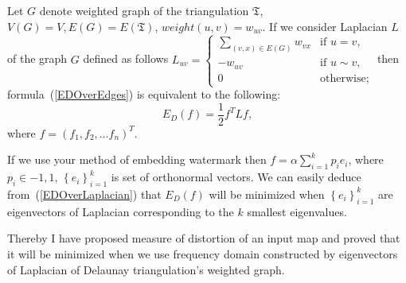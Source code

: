 \documentclass{article}
\begin{document}
Let $G$ denote weighted graph of the triangulation $\mathfrak{T}$, $V(G) = V, E(G) = E(\mathfrak{T})$, $weight(u, v) = w_{uv}$. If we consider Laplacian $L$ of the graph $G$ defined as follows 
$L_{uv} = \begin{cases}
  \sum_{(v, x) \in E(G)}{w_{vx}}&\text{if $u = v,$} \\
  -w_{uv}&\text{if $u \sim v,$} \\
  0 &\text{otherwise;}
\end{cases}
$ then formula~(\ref{EDOverEdges}) is equivalent to the following:
\begin{equation}
\label{EDOverLaplacian}
  E_D(f) = \frac{1}{2} f^T L f,
\end{equation}
where $f = (f_1, f_2, \dots f_n)^T$.

If we use your method of embedding watermark then $f = \alpha \sum_{i=1}^k p_i e_i$, where $p_i \in {-1, 1}$, $\left\{e_i\right\}_{i=1}^k$ is set of orthonormal vectors.
We can easily deduce from~(\ref{EDOverLaplacian}) that $E_D(f)$ will be minimized when $\left\{e_i\right\}_{i=1}^k$ are eigenvectors of Laplacian corresponding to the $k$ smallest eigenvalues.

Thereby I have proposed measure of distortion of an input map and proved that it will be minimized when we use frequency domain constructed by eigenvectors of Laplacian of Delaunay triangulation's weighted graph. 
\end{document}

